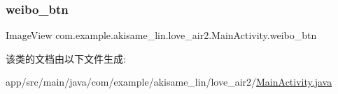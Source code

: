 \subsubsection{\texorpdfstring{weibo\_btn}{weibo\_btn}}
{\footnotesize\ttfamily Image\+View com.\+example.\+akisame\+\_\+lin.\+love\+\_\+air2.\+Main\+Activity.\+weibo\+\_\+btn\hspace{0.3cm}{\ttfamily [package]}}



该类的文档由以下文件生成\+:\begin{DoxyCompactItemize}
\item 
app/src/main/java/com/example/akisame\+\_\+lin/love\+\_\+air2/\mbox{\hyperlink{java_2com_2example_2akisame__lin_2love__air2_2_main_activity_8java}{Main\+Activity.\+java}}\end{DoxyCompactItemize}
